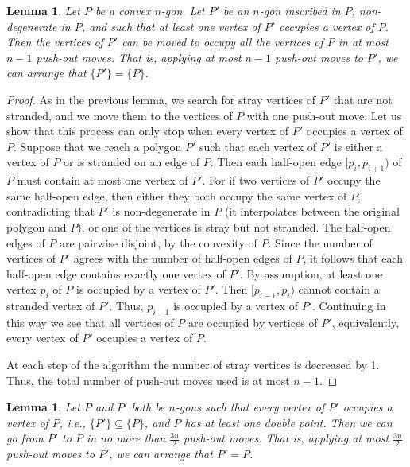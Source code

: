 \documentclass[11pt]{amsart}
\newtheorem{lemma}[theorem]{Lemma}
\theoremstyle{remark}
\numberwithin{equation}{section}
\begin{document}


\begin{lemma}\label{whenmeqn}
Let $P$ be a convex $n$-gon. Let $P'$ be an $n$-gon inscribed in $P$, non-degenerate in $P$, and such that at least one vertex of $P'$ occupies a vertex of $P$. Then the  vertices of $P'$ can be moved to occupy all the vertices of $P$ in at most $n-1$ push-out moves. That is, applying at most $n-1$ push-out moves to $P'$, we can arrange that 
$\{P'\}=\{P\}$.
\end{lemma}

\begin{proof}
As in the previous lemma, we search for stray vertices of $P'$ that are not stranded, and we move them to  the vertices of $P$ with one push-out move. Let us show that
this process can only stop when every vertex of $P'$ occupies a vertex of $P$. Suppose that we reach a polygon $P'$ such that each vertex of $P'$ is either a vertex of $P$ or is stranded on an edge of $P$. Then each half-open edge $[p_i,p_{i+1})$ of $P$ must contain at most one vertex of $P'$. For if two vertices of $P'$ occupy the same half-open edge, then 
either they both occupy the same vertex of $P$, contradicting that $P'$ is non-degenerate in $P$ (it interpolates between the original polygon and $P$), or one of the vertices is stray but not stranded. The half-open edges of $P$ are pairwise disjoint, by the convexity of $P$. Since the number of vertices of $P'$ agrees with the number of half-open edges of $P$, it follows that each half-open edge  contains exactly one vertex of $P'$. By assumption, at least one vertex $p_i$ of $P$ is occupied by a vertex of $P'$. Then $[p_{i-1},p_i)$ cannot contain a stranded vertex of $P'$. Thus, $p_{i-1}$ is occupied by a vertex of $P'$. Continuing in this way we see that all vertices of $P$ are occupied by vertices of $P'$, equivalently, every vertex of $P'$ occupies a vertex of $P$. 

At each step of the algorithm the number of stray vertices is decreased by 1. Thus, the total number of push-out moves used is at most $n-1$.
\end{proof}






\begin{lemma}\label{permutation}
Let $P$ and $P'$ both be $n$-gons such that every vertex of $P'$ occupies a vertex of $P$, i.e., $\{P'\}\subseteq \{P\}$, and $P$ has at least one double point. Then we can go from $P'$ to $P$ in no more than $\displaystyle\frac{3n}{2}$ push-out moves. That is, applying at most $\displaystyle\frac{3n}{2}$ push-out moves to $P'$, we can arrange that $P'=P$.
\end{lemma}
\end{document}
